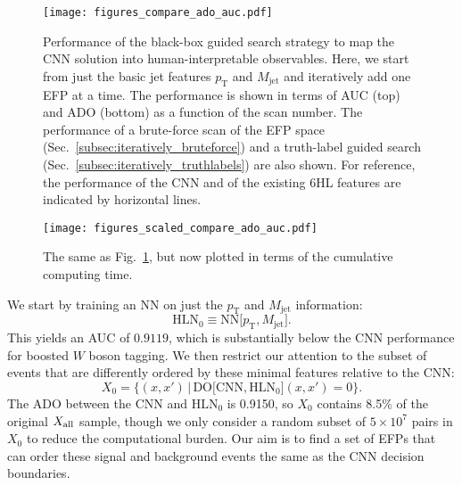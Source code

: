 \documentclass[aps,prd,twocolumn,superscriptaddress,preprintnumbers,nofootinbib,longbibliography,floatfix]{revtex4-1}
\newcommand{\CNN}{\text{CNN}}
\newcommand{\PTM}{\text{HLN}_0}
\newcommand{\DO}{\text{DO}}
\newcommand{\NN}{\text{NN}}
\newcommand{\Fig}[1]{Fig.~\ref{#1}}
\newcommand{\Sec}[1]{Sec.~\ref{#1}}
\begin{document}
\begin{figure}[t]
	\centering
	\texttt{[image: figures\_compare\_ado\_auc.pdf]}
	\caption{
	Performance of the black-box guided search strategy to map the CNN solution into human-interpretable observables. Here, we start from just the basic jet features $p_{\textrm{T}}$ and $M_{\textrm{jet}}$ and iteratively add one EFP at a time. The performance is shown in terms of AUC (top) and ADO (bottom) as a function of the scan number. The performance of a brute-force scan of the EFP space (\Sec{subsec:iteratively_bruteforce}) and a truth-label guided search (\Sec{subsec:iteratively_truthlabels}) are also shown. For reference, the performance of the CNN and of the existing 6HL features are indicated by horizontal lines.}
	\label{fig:maxGraph}
\end{figure}

\begin{figure}[t]
	\centering
	\texttt{[image: figures\_scaled\_compare\_ado\_auc.pdf]}
	\caption{The same as \Fig{fig:maxGraph}, but now plotted in terms of the cumulative computing time. 
	}
	\label{fig:maxComputeGraph}
\end{figure}

We start by training an NN on just the $p_{\textrm{T}}$ and $M_{\textrm{jet}}$ information:   
\begin{equation}
\label{eq:PTM}
\PTM \equiv \NN \big[p_{\textrm{T}},M_{\textrm{jet}} \big].
\end{equation}
This yields an AUC of $0.9119$, which is substantially below the CNN performance for boosted $W$ boson tagging. We then restrict our attention to the subset of events that are differently ordered by these minimal features relative to the CNN:
\begin{equation}
	X_0 = \Big\{ (x,x') \, \Big| \, \DO\big[\CNN, \PTM \big](x,x') = 0 \Big\}.
\end{equation}
The ADO between the CNN and $\PTM$ is 0.9150, so $X_0$ contains 8.5\% of the original $X_{\rm all}$ sample, though we only consider a random subset of $5 \times 10^7$  pairs in $X_0$ to reduce the computational burden. Our aim is to find a set of EFPs that can order these signal and background events the same as the CNN decision boundaries.
\end{document}
